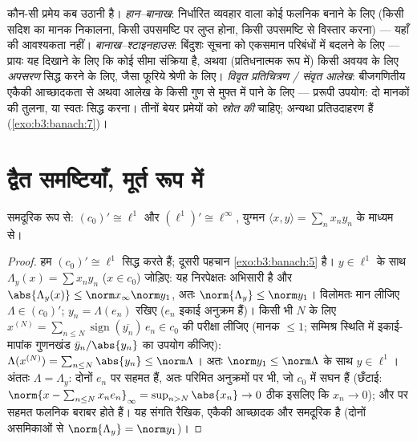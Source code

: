 \begin{method}\label{met:b3:banach:trilogy}
कौन-सी प्रमेय कब उठानी है। \emph{हान--बानाख}: निर्धारित व्यवहार
वाला कोई फलनिक बनाने के लिए (किसी सदिश का मानक निकालना, किसी
उपसमष्टि पर लुप्त होना, किसी उपसमष्टि से विस्तार करना) --- यहाँ
 की आवश्यकता नहीं। \emph{बानाख--श्टाइनहाउस}: बिंदुशः सूचना
को एकसमान परिबंधों में बदलने के लिए --- प्रायः यह दिखाने के लिए
कि कोई सीमा संक्रिया  है, अथवा (प्रतिधनात्मक रूप में) किसी
अवयव के लिए \emph{अपसरण} सिद्ध करने के लिए, जैसा फूरिये श्रेणी के
लिए। \emph{विवृत प्रतिचित्रण / संवृत आलेख}: बीजगणितीय एकैकी
आच्छादकता से अथवा आलेख के किसी  गुण से मुफ्त में 
पाने के लिए --- प्ररूपी उपयोग: दो  मानकों की तुलना, या
स्वतः  सिद्ध करना। तीनों बेयर प्रमेयों को \emph{स्रोत की}
 चाहिए; अन्यथा प्रतिउदाहरण हैं (\cref{exo:b3:banach:7})।
\end{method}

\section{द्वैत समष्टियाँ, मूर्त रूप में}

\begin{theorem}\label{thm:b3:banach:duals}
समदूरिक रूप से: $(c_0)' \cong \ell^1$ और $(\ell^1)' \cong
\ell^\infty$, युग्मन $\langle x, y\rangle = \sum_n
x_ny_n$ के
माध्यम से।
\end{theorem}

\begin{proof}
हम $(c_0)' \cong \ell^1$ सिद्ध करते हैं; दूसरी पहचान \cref{exo:b3:banach:5} है। $y \in \ell^1$ के साथ
$\Lambda_y(x)
= \sum x_ny_n$ ($x \in c_0$) जोड़िए: यह निरपेक्षतः अभिसारी है और $\abs{\Lambda_y(x)} \leq \norm x_\infty\norm y_1$, अतः
$\norm{\Lambda_y} \leq \norm y_1$। विलोमतः मान लीजिए $\Lambda \in
(c_0)'$; $y_n = \Lambda(e_n)$ रखिए ($e_n$ इकाई अनुक्रम
हैं)। किसी भी $N$ के लिए $x^{(N)} = \sum_{n \leq N}
\operatorname{sign}(\overline{y_n})\,e_n \in c_0$ की परीक्षा लीजिए (मानक $\leq
1$;
सम्मिश्र स्थिति में इकाई-मापांक गुणनखंड $\bar y_n/\abs
{y_n}$ का उपयोग कीजिए):
$\Lambda(x^{(N)}) = \sum_{n\leq N}\abs{y_n} \leq
\norm\Lambda$। अतः $\norm y_1 \leq
\norm\Lambda$ के साथ $y \in \ell^1$। अंततः $\Lambda = \Lambda_y$: दोनों $e_n$ पर सहमत
हैं, अतः परिमित अनुक्रमों पर भी, जो $c_0$ में सघन हैं (छँटाई:
$\norm{x - \sum_{n \leq N}x_ne_n}_\infty = \sup_{n > N}\abs{x_n}
\to 0$ ठीक इसलिए कि $x_n \to 0$); और  पर सहमत  फलनिक
बराबर होते हैं। यह संगति रैखिक, एकैकी आच्छादक और समदूरिक है
(दोनों असमिकाओं से $\norm{\Lambda_y} = \norm y_1$)।
\end{proof}

